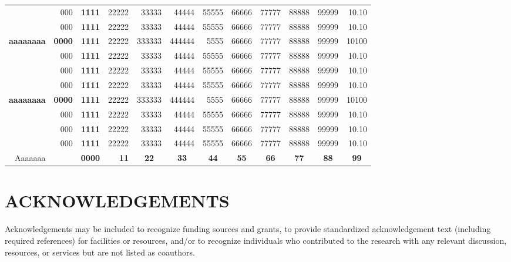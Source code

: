 \documentclass[9pt,twoside]{rmaa-rho-class/rmaa-rho}
\begin{document}
\begin{landscape}
\begin{table}[htbp]
\begin{tabular}{rrrrrrrrrrrr}
          & 000   & \textbf{1111} & 22222 & 33333 & 44444 & 55555  & 66666 & 77777 & 88888 & 99999 & 10.10 \\
          & 000   & \textbf{1111} & 22222 & 33333 & 44444 & 55555  & 66666 & 77777 & 88888 & 99999 & 10.10 \\
    \textbf{aaaaaaaa} & \textbf{0000} & \textbf{1111} & 22222 & 333333 & 444444 & 5555  & 66666 & 77777 & 88888 & 99999 & 10100 \\
          & 000   & \textbf{1111} & 22222 & 33333 & 44444 & 55555  & 66666 & 77777 & 88888 & 99999 & 10.10 \\
          & 000   & \textbf{1111} & 22222 & 33333 & 44444 & 55555  & 66666 & 77777 & 88888 & 99999 & 10.10 \\
          & 000   & \textbf{1111} & 22222 & 33333 & 44444 & 55555  & 66666 & 77777 & 88888 & 99999 & 10.10 \\
    \textbf{aaaaaaaa} & \textbf{0000} & \textbf{1111} & 22222 & 333333 & 444444 & 5555  & 66666 & 77777 & 88888 & 99999 & 10100 \\
          & 000   & \textbf{1111} & 22222 & 33333 & 44444 & 55555  & 66666 & 77777 & 88888 & 99999 & 10.10 \\
          & 000   & \textbf{1111} & 22222 & 33333 & 44444 & 55555  & 66666 & 77777 & 88888 & 99999 & 10.10 \\
          & 000   & \textbf{1111} & 22222 & 33333 & 44444 & 55555  & 66666 & 77777 & 88888 & 99999 & 10.10 \\
    \midrule
    Aaaaaaa &    & \textbf{0000} & \textbf{11} & \multicolumn{1}{c}{\textbf{22}} & \multicolumn{1}{c}{\textbf{33}} & \multicolumn{1}{c}{\textbf{44}} & \multicolumn{1}{c}{\textbf{55}} & \multicolumn{1}{c}{\textbf{66}} & \multicolumn{1}{c}{\textbf{77}} & \multicolumn{1}{c}{\textbf{88}} & \multicolumn{1}{c}{\textbf{99}} \\
    \bottomrule
    \end{tabular}%
  \label{tab:addlabel}%
\end{table}
\end{landscape}





\section{ACKNOWLEDGEMENTS}

Acknowledgements may be included to recognize funding sources and grants, to provide standardized acknowledgement text (including required references) for facilities or resources, and/or to recognize individuals who contributed to the research with any relevant discussion, resources, or services but are not listed as coauthors.
\end{document}
